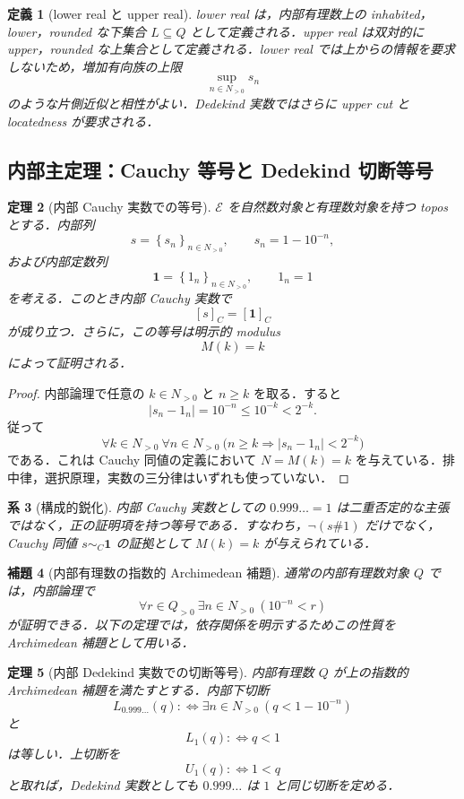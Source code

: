 \documentclass[a4paper,11pt]{ltjsarticle}
\theoremstyle{jpdef}
\newtheorem{definition}{定義}[section]
\theoremstyle{jpthm}
\newtheorem{theorem}[definition]{定理}
\newtheorem{lemma}[definition]{補題}
\newtheorem{corollary}[definition]{系}
\newcommand{\seq}[2]{\left\{#1\right\}_{#2}}
\begin{document}
\begin{definition}[lower real と upper real]
lower real は，内部有理数上の inhabited，lower，rounded な下集合 \(L\subseteq Q\) として定義される．upper real は双対的に upper，rounded な上集合として定義される．lower real では上からの情報を要求しないため，増加有向族の上限
\[
  \sup_{n\in N_{>0}}s_n
\]
のような片側近似と相性がよい．Dedekind 実数ではさらに upper cut と locatedness が要求される．
\end{definition}

\subsection{内部主定理：Cauchy 等号と Dedekind 切断等号}

\begin{theorem}[内部 Cauchy 実数での等号]\label{thm:internal-cauchy}
\(\mathcal E\) を自然数対象と有理数対象を持つ topos とする．内部列
\[
  s=\seq{s_n}{n\in N_{>0}},\qquad s_n=1-10^{-n},
\]
および内部定数列
\[
  \mathbf1=\seq{1_n}{n\in N_{>0}},\qquad 1_n=1
\]
を考える．このとき内部 Cauchy 実数で
\[
  [s]_C=[\mathbf1]_C
\]
が成り立つ．さらに，この等号は明示的 modulus
\[
  M(k)=k
\]
によって証明される．
\end{theorem}

\begin{proof}
内部論理で任意の \(k\in N_{>0}\) と \(n\ge k\) を取る．すると
\[
  |s_n-1_n|=10^{-n}\le 10^{-k}<2^{-k}.
\]
従って
\[
  \forall k\in N_{>0}\ \forall n\in N_{>0}\
  \bigl(n\ge k\Rightarrow |s_n-1_n|<2^{-k}\bigr)
\]
である．これは Cauchy 同値の定義において \(N=M(k)=k\) を与えている．排中律，選択原理，実数の三分律はいずれも使っていない．
\end{proof}

\begin{corollary}[構成的鋭化]
内部 Cauchy 実数としての \(0.999\ldots=1\) は二重否定的な主張ではなく，正の証明項を持つ等号である．すなわち，\(\neg(s\#1)\) だけでなく，Cauchy 同値 \(s\sim_C\mathbf1\) の証拠として \(M(k)=k\) が与えられている．
\end{corollary}


\begin{lemma}[内部有理数の指数的 Archimedean 補題]
通常の内部有理数対象 \(Q\) では，内部論理で
\[
  \forall r\in Q_{>0}\ \exists n\in N_{>0}\ (10^{-n}<r)
\]
が証明できる．以下の定理では，依存関係を明示するためこの性質を Archimedean 補題として用いる．
\end{lemma}

\begin{theorem}[内部 Dedekind 実数での切断等号]
内部有理数 \(Q\) が上の指数的 Archimedean 補題を満たすとする．内部下切断
\[
  L_{0.999\ldots}(q):\Longleftrightarrow
  \exists n\in N_{>0}\ (q<1-10^{-n})
\]
と
\[
  L_1(q):\Longleftrightarrow q<1
\]
は等しい．上切断を
\[
  U_1(q):\Longleftrightarrow 1<q
\]
と取れば，Dedekind 実数としても \(0.999\ldots\) は \(1\) と同じ切断を定める．
\end{theorem}
\end{document}
